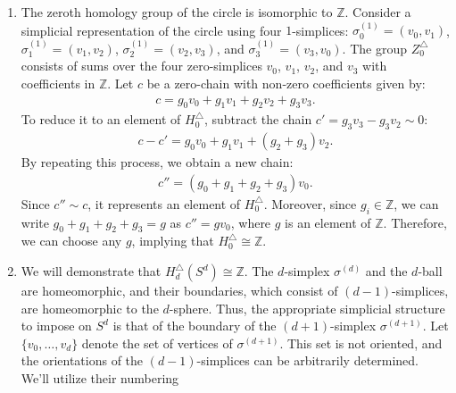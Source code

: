 \begin{example}\noindent
	\begin{enumerate}
		\item The zeroth homology group of the circle is isomorphic to \(\mathbb{Z}\).
		      Consider a simplicial representation of the circle using four \(1\)-simplices:
		      \(\sigma_{0}^{(1)} = (v_{0}, v_{1})\), \(\sigma_{1}^{(1)} = (v_{1}, v_{2})\), \(\sigma_{2}^{(1)} = (v_{2}, v_{3})\), and \(\sigma_{3}^{(1)} = (v_{3}, v_{0})\).
		      The group \(Z^{\triangle}_{0}\) consists of sums over the four zero-simplices \(v_{0}\),
		      \(v_{1}\), \(v_{2}\), and \(v_{3}\) with coefficients in \(\mathbb{Z}\). Let \(c\) be a zero-chain
		      with non-zero coefficients given by:
		      \begin{align}
		      	c = g_{0} v_{0} + g_{1} v_{1} + g_{2} v_{2} + g_{3} v_{3}. 
		      \end{align}
		      To reduce it to an element of \(H^{\triangle}_{0}\), subtract the chain \(c' =  g_{3} v_{3} - g_{3} v_{2} \sim 0\):
		      \begin{align}
		      	c - c' = g_{0} v_{0} + g_{1} v_{1} + (g_{2} + g_{3}) v_{2}. 
		      \end{align}
		      By repeating this process, we obtain a new chain:
		      \begin{align}
		      	c'' = (g_{0} + g_{1} + g_{2} + g_{3}) v_{0}. 
		      \end{align}
		      Since \(c'' \sim c\), it represents an element of \(H^{\triangle}_{0}\). Moreover,
		      since \(g_{i} \in \mathbb{Z}\), we can write
		      \(g_{0} + g_{1} + g_{2} + g_{3} = g\) as \(c'' = g v_{0}\), where \(g\)
		      is an element of \(\mathbb{Z}\). Therefore, we can choose any \(g\), implying
		      that \(H^{\triangle}_{0} \cong \mathbb{Z}\).
		\item We will demonstrate that \(H^{\triangle}_{d}(S^{d}) \cong \mathbb{Z}\). The
		      \(d\)-simplex \(\sigma^{(d)}\) and the \(d\)-ball are homeomorphic, and their boundaries,
		      which consist of \((d-1)\)-simplices, are homeomorphic to the \(d\)-sphere.
		      Thus, the appropriate simplicial structure to impose on \(S^{d}\) is that of
		      the boundary of the \((d+1)\)-simplex \(\sigma^{(d+1)}\). Let
		      \(\{v_{0}, \ldots, v_{d}\}\) denote the set of vertices of
		      \(\sigma^{(d+1)}\). This set is not oriented, and the orientations of the
		      \((d-1)\)-simplices can be arbitrarily determined. We'll utilize their numbering

\end{enumerate}
\end{example}

